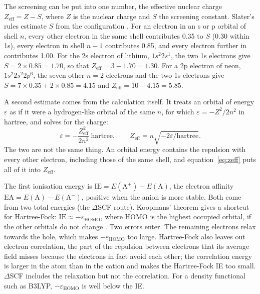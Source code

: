The screening can be put into one number, the effective nuclear charge $Z_\mathrm{eff} = Z - S$, where $Z$ is the nuclear charge and $S$ the screening constant. Slater's rules estimate $S$ from the configuration \cite{slater1930}. For an electron in an s or p orbital of shell $n$, every other electron in the same shell contributes 0.35 to $S$ (0.30 within 1s), every electron in shell $n-1$ contributes 0.85, and every electron further in contributes 1.00. For the 2s electron of lithium, $1s^2 2s^1$, the two 1s electrons give $S = 2 \times 0.85 = 1.70$, so that $Z_\mathrm{eff} = 3 - 1.70 = 1.30$. For a 2p electron of neon, $1s^2 2s^2 2p^6$, the seven other $n = 2$ electrons and the two 1s electrons give $S = 7 \times 0.35 + 2 \times 0.85 = 4.15$ and $Z_\mathrm{eff} = 10 - 4.15 = 5.85$.

A second estimate comes from the calculation itself. It treats an orbital of energy $\varepsilon$ as if it were a hydrogen-like orbital of the same $n$, for which $\varepsilon = -Z^2/2n^2$ in hartree, and solves for the charge:
\begin{equation}
	\varepsilon = -\frac{Z_\mathrm{eff}^2}{2n^2}\ \text{hartree}, \qquad
	Z_\mathrm{eff} = n\sqrt{-2\varepsilon/\text{hartree}} .
	\label{eq:zeff}
\end{equation}
The two are not the same thing. An orbital energy contains the repulsion with every other electron, including those of the same shell, and equation~\eqref{eq:zeff} puts all of it into $Z_\mathrm{eff}$.

The first ionisation energy is $\mathrm{IE} = E(\mathrm{A}^+) - E(\mathrm{A})$, the electron affinity $\mathrm{EA} = E(\mathrm{A}) - E(\mathrm{A}^-)$, positive when the anion is more stable. Both come from two total energies (the $\Delta$SCF route). Koopmans' theorem gives a shortcut for Hartree-Fock: $\mathrm{IE} \approx -\varepsilon_\mathrm{HOMO}$, where HOMO is the highest occupied orbital, if the other orbitals do not change \cite{koopmans1934}. Two errors enter. The remaining electrons relax towards the hole, which makes $-\varepsilon_\mathrm{HOMO}$ too large. Hartree-Fock also leaves out electron correlation, the part of the repulsion between electrons that its average field misses because the electrons in fact avoid each other; the correlation energy is larger in the atom than in the cation and makes the Hartree-Fock IE too small. $\Delta$SCF includes the relaxation but not the correlation. For a density functional such as B3LYP, $-\varepsilon_\mathrm{HOMO}$ is well below the IE.


